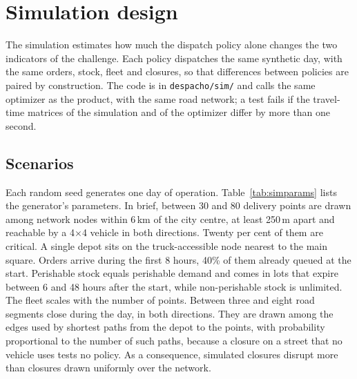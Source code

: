 \documentclass[11pt]{article}
\newcommand{\code}[1]{\texttt{\small #1}}
\begin{document}
\section{Simulation design}\label{sec:simdesign}

The simulation estimates how much the dispatch policy alone changes the two indicators of the challenge. Each policy dispatches the same synthetic day, with the same orders, stock, fleet and closures, so that differences between policies are paired by construction. The code is in \code{despacho/sim/} and calls the same optimizer as the product, with the same road network; a test fails if the travel-time matrices of the simulation and of the optimizer differ by more than one second.

\subsection{Scenarios}

Each random seed generates one day of operation. Table~\ref{tab:simparams} lists the generator's parameters. In brief, between 30 and 80 delivery points are drawn among network nodes within 6\,km of the city centre, at least 250\,m apart and reachable by a 4$\times$4 vehicle in both directions. Twenty per cent of them are critical. A single depot sits on the truck-accessible node nearest to the main square. Orders arrive during the first 8 hours, 40\% of them already queued at the start. Perishable stock equals perishable demand and comes in lots that expire between 6 and 48 hours after the start, while non-perishable stock is unlimited. The fleet scales with the number of points. Between three and eight road segments close during the day, in both directions. They are drawn among the edges used by shortest paths from the depot to the points, with probability proportional to the number of such paths, because a closure on a street that no vehicle uses tests no policy. As a consequence, simulated closures disrupt more than closures drawn uniformly over the network.
\end{document}
